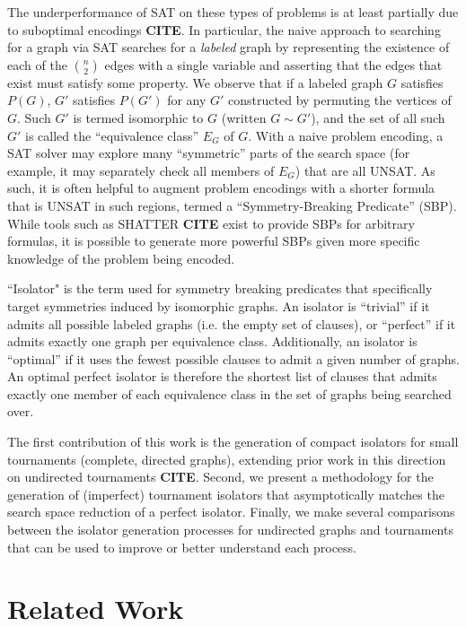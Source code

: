 \documentclass[a4paper,UKenglish,cleveref, autoref, thm-restate]{lipics-v2021}
\begin{document}
The underperformance of SAT on these types of problems is at least partially due to suboptimal encodings \textbf{CITE}. In particular, the naive approach to searching for a graph via SAT searches for a \textit{labeled} graph by representing the existence of each of the $n \choose 2$ edges with a single variable and asserting that the edges that exist must satisfy some property. We observe that if a labeled graph $G$ satisfies $P(G)$, $G'$ satisfies $P(G')$ for any $G'$ constructed by permuting the vertices of $G$. Such $G'$ is termed isomorphic to $G$ (written $G\sim G'$), and the set of all such $G'$ is called the ``equivalence class'' $E_G$ of $G$. With a naive problem encoding, a SAT solver may explore many ``symmetric'' parts of the search space (for example, it may separately check all members of $E_G$) that are all UNSAT. As such, it is often helpful to augment problem encodings with a shorter formula that is UNSAT in such regions, termed a ``Symmetry-Breaking Predicate'' (SBP). While tools such as SHATTER \textbf{CITE} exist to provide SBPs for arbitrary formulas, it is possible to generate more powerful SBPs given more specific knowledge of the problem being encoded.

 ``Isolator" is the term used for symmetry breaking predicates that specifically target symmetries induced by isomorphic graphs. An isolator is ``trivial'' if it admits all possible labeled graphs (i.e. the empty set of clauses), or ``perfect'' if it admits exactly one graph per equivalence class. Additionally, an isolator is ``optimal'' if it uses the fewest possible clauses to admit a given number of graphs. An optimal perfect isolator is therefore the shortest list of clauses that admits exactly one member of each equivalence class in the set of graphs being searched over.

The first contribution of this work is the generation of compact isolators for small tournaments (complete, directed graphs), extending prior work in this direction on undirected tournaments \textbf{CITE}. Second, we present a methodology for the generation of (imperfect) tournament isolators that asymptotically matches the search space reduction of a perfect isolator. Finally, we make several comparisons between the isolator generation processes for undirected graphs and tournaments that can be used to improve or better understand each process.
\section{Related Work}
\end{document}
